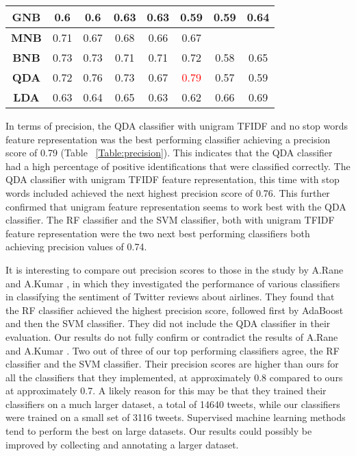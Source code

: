 \begin{table}[h!]
{\begin{tabular}{cccccccc}
\textbf{GNB} & 0.6 & 0.6 & 0.63 & 0.63 & 0.59 & 0.59 & 0.64 \\ \hline
\rowcolor[HTML]{EFEFEF} 
\textbf{MNB} & \multicolumn{1}{c}{\cellcolor[HTML]{EFEFEF}0.71} & 0.67 & 0.68 & 0.66 & 0.67 &  &  \\ \hline
\rowcolor[HTML]{FFFFFF} 
\textbf{BNB} & 0.73 & 0.73 & 0.71 & 0.71 & 0.72 & 0.58 & 0.65 \\ \hline
\rowcolor[HTML]{EFEFEF} 
\textbf{QDA} & 0.72 & 0.76 & 0.73 & 0.67 & \textcolor{red}{0.79} & 0.57 & 0.59 \\ \hline
\rowcolor[HTML]{FFFFFF} 
\textbf{LDA} & 0.63 & 0.64 & 0.65 & 0.63 & 0.62 & 0.66 & 0.69 \\ \hline
\end{tabular}}
\end{table}

In terms of precision, the QDA classifier with unigram TFIDF and no stop words feature representation was the best performing classifier achieving a precision score of 0.79 (Table ~\ref{Table:precision}). This indicates that the QDA classifier had a high percentage of positive identifications that were classified correctly. The QDA classifier with unigram TFIDF feature representation, this time with stop words included achieved the next highest precision score of 0.76. This further confirmed that unigram feature representation seems to work best with the QDA classifier. The RF classifier and the SVM classifier, both with unigram TFIDF feature representation were the two next best performing classifiers both achieving precision values of 0.74.

It is interesting to compare out precision scores to those in the study by A.Rane and A.Kumar \cite{Rane2018}, in which they investigated the performance of various classifiers in classifying the sentiment of Twitter reviews about airlines. They found that the RF classifier achieved the highest precision score, followed first by AdaBoost and then the SVM classifier. They did not include the QDA classifier in their evaluation. Our results do not fully confirm or contradict the results of A.Rane and A.Kumar \cite{Rane2018}. Two out of three of our top performing classifiers agree, the RF classifier and the SVM classifier. Their precision scores are higher than ours for all the classifiers that they implemented, at approximately 0.8 compared to ours at approximately 0.7. A likely reason for this may be that they trained their classifiers on a much larger dataset, a total of 14640 tweets, while our classifiers were trained on a small set of 3116 tweets. Supervised machine learning methods tend to perform the best on large datasets. Our results could possibly be improved by collecting and annotating a larger dataset.

